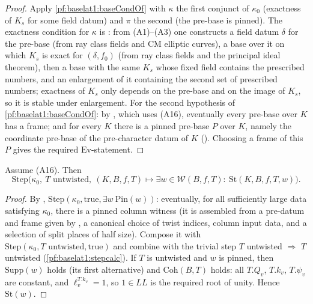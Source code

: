 \begin{proof}
Apply \cref{pf:baselat1:baseCondOf} with $\kappa$ the first conjunct of $\kappa_0$ (exactness of $K_s$ for some
field datum) and $\pi$ the second (the pre-base is pinned). The exactness condition for $\kappa$ is
: from (A1)--(A3) one constructs a field
datum $\delta$ for the pre-base (from ray class fields and CM elliptic curves), a base over it on which
$K_s$ is exact for $(\delta,f_0)$ (from ray class fields and the principal ideal theorem), then a base with the
same $K_s$ whose fixed field contains the prescribed numbers, and an enlargement of it containing the second
set of prescribed numbers; exactness of $K_s$ only depends on the pre-base and on the image of $K_s$, so it is
stable under enlargement. For the second hypothesis of \cref{pf:baselat1:baseCondOf}: by
, which uses (A16), eventually every
pre-base over $K$ has a frame; and for every $K$ there is a pinned pre-base $P$ over $K$,
namely the coordinate pre-base of the pre-character datum of $K$
(). Choosing a frame of this $P$ gives the required
$\mathrm{Ev}$-statement.
\end{proof}

\begin{proposition}\label{pf:baselat1:stepstart}
Assume (A16). Then
\[\mathrm{Step}\bigl(\kappa_0,\ T\text{ untwisted},\ (K,B,f,T)\mapsto\exists w\in\mathcal{W}(B,f,T):\
\mathrm{St}(K,B,f,T,w)\bigr).\]
\end{proposition}

\begin{proof}
By ,
$\mathrm{Step}(\kappa_0,\mathrm{true},\exists w\ \mathrm{Pin}(w))$: eventually, for all sufficiently
large data satisfying $\kappa_0$, there is a pinned column witness (it is assembled from a pre-datum and
frame given by \lref{GlobalTheory.Mem.Top.ev_preX_frame}, a canonical choice of twist indices, column
input data, and a selection of split places of half size). Compose it with $\mathrm{Step}(\kappa_0,
T\text{ untwisted},\mathrm{true})$ and combine with the trivial step $T$ untwisted $\Rightarrow$ $T$ untwisted
(\cref{pf:baselat1:stepcalc}). If $T$ is untwisted and $w$ is pinned, then $\mathrm{Supp}(w)$ holds (its first
alternative) and $\mathrm{Coh}(B,T)$ holds: all $T.Q_v$, $T.k_v$, $T.\psi_v$ are constant, and
$\ell_v^{T.k_v}=1$, so $1\in\mathit{LL}$ is the required root of unity. Hence $\mathrm{St}(w)$.
\end{proof}

